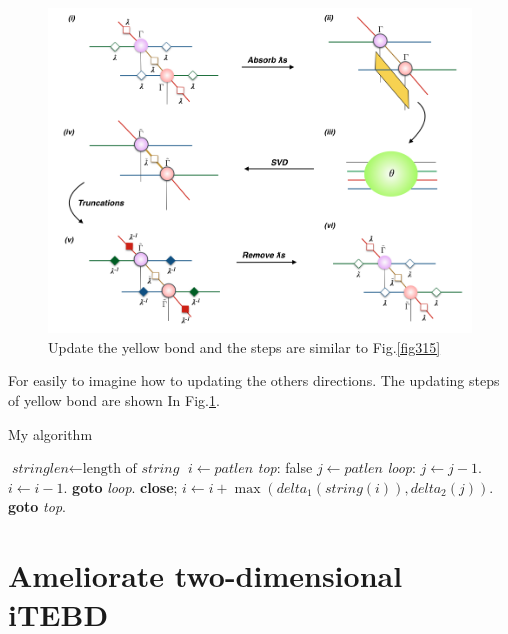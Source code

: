	\begin{figure}[ht]
	\centering
	\includegraphics[width=1.00\textwidth]{figures/fig316.png}
	\caption[The tensor network diagrams of updating the yellow bond in iPEPS with 2D-iTEBD]{Update the yellow bond and the steps are similar to Fig.\ref{fig315}}
	\label{fig316}
	\end{figure}

	For easily to imagine how to updating the others directions. The updating steps of yellow bond are shown In Fig.\ref{fig316}.

\begin{algorithm}
	\caption{My algorithm}\label{euclid}
	\begin{algorithmic}[1]
		\State $\textit{stringlen} \gets \text{length of }\textit{string}$
		\State $i \gets \textit{patlen}$
		\BState \emph{top}:
		 \Return false
		\EndIf
		\State $j \gets \textit{patlen}$
		\BState \emph{loop}:
		\State $j \gets j-1$.
		\State $i \gets i-1$.
		\State \textbf{goto} \emph{loop}.
		\State \textbf{close};
		\EndIf
		\State $i \gets i+\max(\textit{delta}_1(\textit{string}(i)),\textit{delta}_2(j))$.
		\State \textbf{goto} \emph{top}.
		\EndProcedure
	\end{algorithmic}
\end{algorithm}


\section{Ameliorate two-dimensional iTEBD}
\label{2dhastin}

